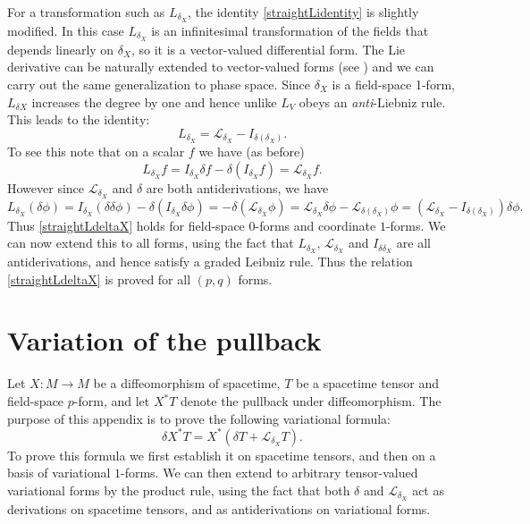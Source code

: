 \documentclass[a4paper,11pt]{article}
\begin{document}
For a transformation such as $L_{\delta_X}$, the identity \eqref{straightLidentity} is slightly modified.
In this case $L_{\delta_X}$ is an infinitesimal transformation of the fields that depends linearly on $\delta_X$, so it is a vector-valued differential form. 
The Lie derivative can be naturally extended to vector-valued forms (see \cite{Kolar1999}) and we can carry out the same generalization to phase space.
Since $\delta_X$ is a field-space 1-form, $L_{\delta X}$ increases the degree by one and hence unlike $L_V$ obeys an \emph{anti}-Liebniz rule.
This leads to the identity:
\begin{equation} \label{straightLdeltaX}
L_{\delta_X} = \mathcal{L}_{\delta_X} - I_{\delta(\delta_X)}.
\end{equation}
To see this note that on a scalar $f$ we have (as before)
\begin{equation}
L_{\delta_X} f = I_{\delta_X} \delta f - \delta (I_{\delta_X} f) = \mathcal{L}_{\delta_X} f.
\end{equation}
However since $\mathcal{L}_{\delta_X}$ and $\delta$ are both antiderivations, we have
\begin{equation}
L_{\delta_X} (\delta \phi) = I_{\delta_X} (\delta \delta \phi) - \delta (I_{\delta_X} \delta \phi) = - \delta (\mathcal{L}_{\delta_X} \phi) = \mathcal{L}_{\delta_X} \delta \phi - \mathcal{L}_{\delta (\delta_X)} \phi = (\mathcal{L}_{\delta_X} - I_{\delta (\delta_X)} ) \delta \phi.
\end{equation}
Thus \eqref{straightLdeltaX} holds for field-space $0$-forms and coordinate $1$-forms.
We can now extend this to all forms, using the fact that $L_{\delta_X}$, $\mathcal{L}_{\delta_X}$ and $I_{\delta \delta_X}$ are all antiderivations, and hence satisfy a graded Leibniz rule.
Thus the relation \eqref{straightLdeltaX} is proved for all $(p,q)$ forms.

\section{Variation of the pullback} \label{appendix:pullback}

Let $X: M \to M$ be a diffeomorphism of spacetime, $T$ be a spacetime tensor and field-space $p$-form, and let $X^*T$ denote the pullback under diffeomorphism.
The purpose of this appendix is to prove the following variational formula:
\begin{equation} \label{pullback}
\delta X^*T = X^*(\delta T + \mathcal{L}_{\delta_X} T).
\end{equation}
To prove this formula we first establish it on spacetime tensors, and then on a basis of variational $1$-forms.
We can then extend to arbitrary tensor-valued variational forms by the product rule, using the fact that both $\delta$ and $\mathcal{L}_{\delta_X}$ act as derivations on spacetime tensors, and as antiderivations on variational forms.
\end{document}
